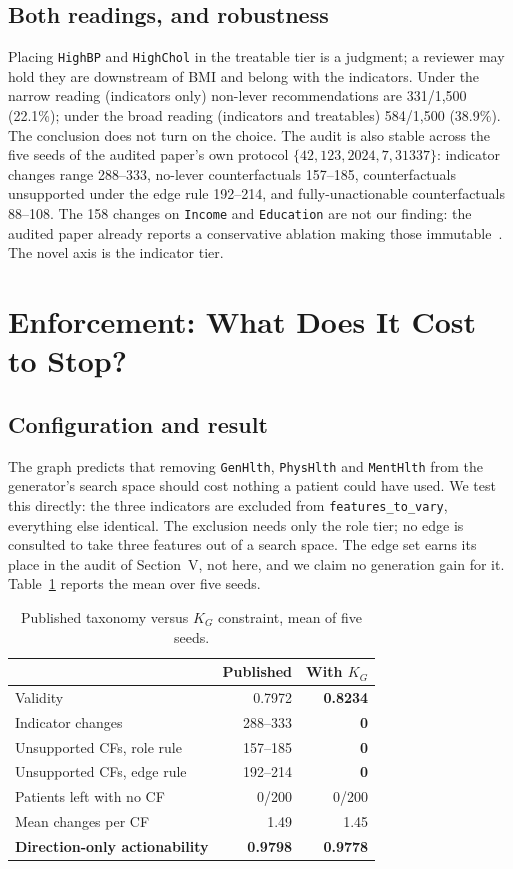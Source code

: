 \documentclass[conference]{IEEEtran}
\begin{document}
\subsection{Both readings, and robustness}
Placing \texttt{HighBP} and \texttt{HighChol} in the treatable tier is a judgment; a reviewer may hold they are downstream of BMI and belong with the indicators. Under the narrow reading (indicators only) non-lever recommendations are 331/1{,}500 (22.1\%); under the broad reading (indicators and treatables) 584/1{,}500 (38.9\%). The conclusion does not turn on the choice. The audit is also stable across the five seeds of the audited paper's own protocol $\{42, 123, 2024, 7, 31337\}$: indicator changes range 288--333, no-lever counterfactuals 157--185, counterfactuals unsupported under the edge rule 192--214, and fully-unactionable counterfactuals 88--108. The 158 changes on \texttt{Income} and \texttt{Education} are not our finding: the audited paper already reports a conservative ablation making those immutable~\cite{thieu2026}. The novel axis is the indicator tier.

\section{Enforcement: What Does It Cost to Stop?}
\subsection{Configuration and result}
The graph predicts that removing \texttt{GenHlth}, \texttt{PhysHlth} and \texttt{MentHlth} from the generator's search space should cost nothing a patient could have used. We test this directly: the three indicators are excluded from \texttt{features\_to\_vary}, everything else identical. The exclusion needs only the role tier; no edge is consulted to take three features out of a search space. The edge set earns its place in the audit of Section~V, not here, and we claim no generation gain for it. Table~\ref{tab:enforce} reports the mean over five seeds.

\begin{table}[t]
\caption{Published taxonomy versus $K_G$ constraint, mean of five seeds.}
\label{tab:enforce}
\centering
\footnotesize
\begin{tabular}{@{}lrr@{}}
\toprule
 & \textbf{Published} & \textbf{With $K_G$} \\
\midrule
Validity & 0.7972 & \textbf{0.8234} \\
Indicator changes & 288--333 & \textbf{0} \\
Unsupported CFs, role rule & 157--185 & \textbf{0} \\
Unsupported CFs, edge rule & 192--214 & \textbf{0} \\
Patients left with no CF & 0/200 & 0/200 \\
Mean changes per CF & 1.49 & 1.45 \\
\textbf{Direction-only actionability} & \textbf{0.9798} & \textbf{0.9778} \\
\bottomrule
\end{tabular}
\end{table}
\end{document}
